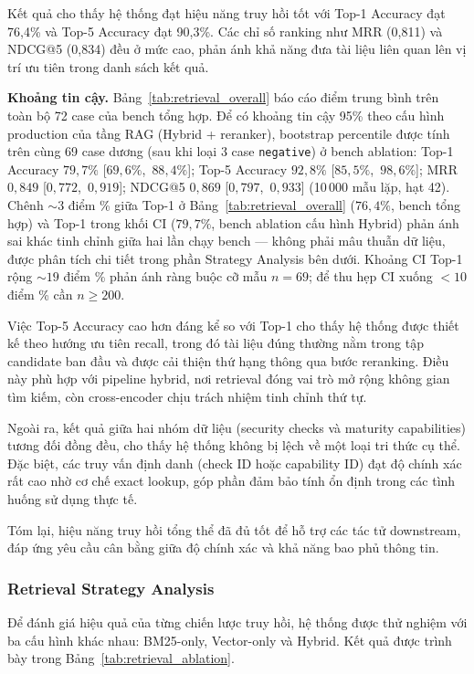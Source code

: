 Kết quả cho thấy hệ thống đạt hiệu năng truy hồi tốt với Top-1 Accuracy đạt 76{,}4\% và Top-5 Accuracy đạt 90{,}3\%. Các chỉ số ranking như MRR (0{,}811) và NDCG@5 (0{,}834) đều ở mức cao, phản ánh khả năng đưa tài liệu liên quan lên vị trí ưu tiên trong danh sách kết quả.

\textbf{Khoảng tin cậy.} Bảng~\ref{tab:retrieval_overall} báo cáo điểm trung bình trên toàn bộ 72 case của bench tổng hợp. Để có khoảng tin cậy 95\% theo cấu hình production của tầng RAG (Hybrid + reranker), bootstrap percentile được tính trên cùng 69 case dương (sau khi loại 3 case \texttt{negative}) ở bench ablation: Top-1 Accuracy $79{,}7\%$ \mbox{[$69{,}6\%$, $88{,}4\%$]}; Top-5 Accuracy $92{,}8\%$ \mbox{[$85{,}5\%$, $98{,}6\%$]}; MRR $0{,}849$ \mbox{[$0{,}772$, $0{,}919$]}; NDCG@5 $0{,}869$ \mbox{[$0{,}797$, $0{,}933$]} (10\,000 mẫu lặp, hạt 42). Chênh $\sim 3$ điểm \% giữa Top-1 ở Bảng~\ref{tab:retrieval_overall} ($76{,}4\%$, bench tổng hợp) và Top-1 trong khối CI ($79{,}7\%$, bench ablation cấu hình Hybrid) phản ánh sai khác tinh chỉnh giữa hai lần chạy bench --- không phải mâu thuẫn dữ liệu, được phân tích chi tiết trong phần Strategy Analysis bên dưới. Khoảng CI Top-1 rộng $\sim 19$ điểm \% phản ánh ràng buộc cỡ mẫu $n=69$; để thu hẹp CI xuống $<10$ điểm \% cần $n \ge 200$.

Việc Top-5 Accuracy cao hơn đáng kể so với Top-1 cho thấy hệ thống được thiết kế theo hướng ưu tiên recall, trong đó tài liệu đúng thường nằm trong tập candidate ban đầu và được cải thiện thứ hạng thông qua bước reranking. Điều này phù hợp với pipeline hybrid, nơi retrieval đóng vai trò mở rộng không gian tìm kiếm, còn cross-encoder chịu trách nhiệm tinh chỉnh thứ tự.

Ngoài ra, kết quả giữa hai nhóm dữ liệu (security checks và maturity capabilities) tương đối đồng đều, cho thấy hệ thống không bị lệch về một loại tri thức cụ thể. Đặc biệt, các truy vấn định danh (check ID hoặc capability ID) đạt độ chính xác rất cao nhờ cơ chế exact lookup, góp phần đảm bảo tính ổn định trong các tình huống sử dụng thực tế.

Tóm lại, hiệu năng truy hồi tổng thể đã đủ tốt để hỗ trợ các tác tử downstream, đáp ứng yêu cầu cân bằng giữa độ chính xác và khả năng bao phủ thông tin.

\subsubsection*{Retrieval Strategy Analysis}

Để đánh giá hiệu quả của từng chiến lược truy hồi, hệ thống được thử nghiệm với ba cấu hình khác nhau: BM25-only, Vector-only và Hybrid. Kết quả được trình bày trong Bảng~\ref{tab:retrieval_ablation}.

